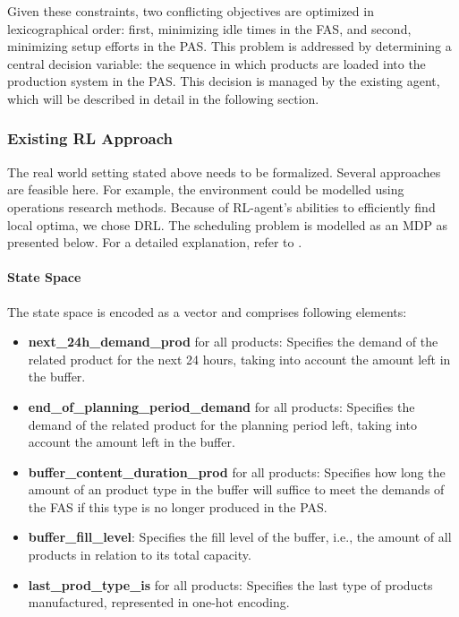 Given these constraints, two conflicting objectives are optimized in lexicographical order: first, minimizing idle times in the FAS, and second, minimizing setup efforts in the PAS. This problem is addressed by determining a central decision variable: the sequence in which products are loaded into the production system in the PAS. This decision is managed by the existing agent, which will be described in detail in the following section.

\subsubsection{Existing RL Approach}
The real world setting stated above needs to be formalized. Several approaches are feasible here. For example, the environment could be modelled using operations research methods. Because of RL-agent's abilities to efficiently find local optima, we chose DRL. The scheduling problem is modelled as an MDP as presented below. For a detailed explanation, refer to \cite{müller2024reinforcement}.

\paragraph{State Space}
The state space is encoded as a vector and comprises following elements:
\begin{itemize}
    \item \textbf{next\_24h\_demand\_prod} for all products: Specifies the demand of the related product for the next 24 hours, taking into account the amount left in the buffer.
    \item  \textbf{end\_of\_planning\_period\_demand} for all products: Specifies the demand of the related product for the planning period left, taking into account the amount left in the buffer.
    \item \textbf{buffer\_content\_duration\_prod} for all products: Specifies how long the amount of an product type in the buffer will suffice to meet the demands of the FAS if this type is no longer produced in the PAS.
    \item  \textbf{buffer\_fill\_level}: Specifies the fill level of the buffer, i.e., the amount of all products in relation to its total capacity.
    \item  \textbf{last\_prod\_type\_is} for all products: Specifies the last type of products manufactured, represented in one-hot encoding.
\end{itemize}

